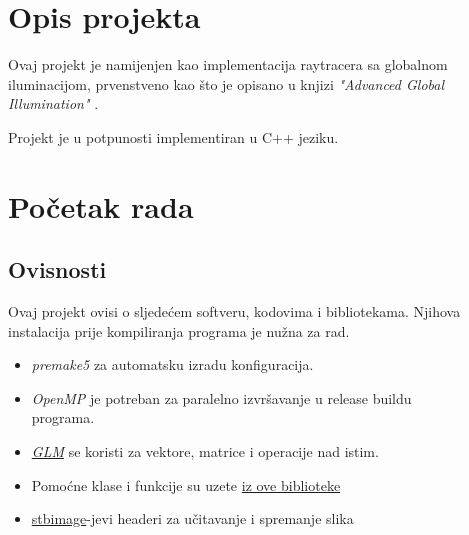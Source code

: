 \documentclass[
12pt, %
oneside, %
english, %
singlespacing, %
parskip, %
headsepline, %
chapterinoneline, %
consistentlayout, %
]{MastersDoctoralThesis} %
\begin{document}

\tableofcontents %


\mainmatter %

\pagestyle{thesis} %


\chapter{Opis projekta}
Ovaj projekt je namijenjen kao implementacija raytracera sa globalnom iluminacijom, prvenstveno
kao što je opisano u knjizi \emph{"Advanced Global Illumination"} \cite{advGI}.

Projekt je u potpunosti implementiran u C++ jeziku.

{\let\clearpage\relax \chapter{Početak rada}}

\section{Ovisnosti}
Ovaj projekt ovisi o sljedećem softveru, kodovima i bibliotekama. Njihova instalacija prije
kompiliranja programa je nužna za rad.
\begin{itemize}
	\item \emph{premake5} za automatsku izradu konfiguracija.
	\item \emph{OpenMP} je potreban za paralelno izvršavanje u release buildu \\ programa.
	\item \href{https://github.com/g-truc/glm}{\emph{GLM}} se koristi za vektore, matrice i
	      operacije nad istim.
	\item Pomoćne klase i funkcije su uzete \href{https://github.com/Lame-een/LameUtil}{iz ove biblioteke}
	\item \href{https://github.com/nothings/stb}{stbimage}-jevi headeri za učitavanje i spremanje slika
\end{itemize}
\end{document}

